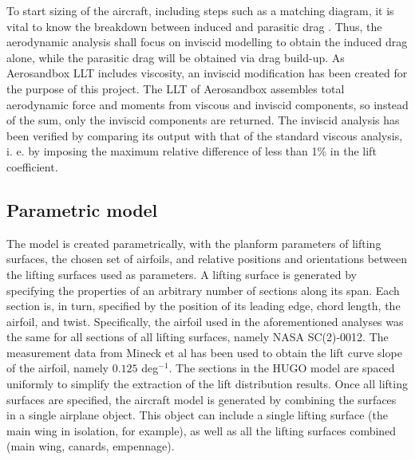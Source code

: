 To start sizing of the aircraft, including steps such as a matching diagram, it is vital to know the breakdown between induced and parasitic drag \cite{Vos}. Thus, the aerodynamic analysis shall focus on inviscid modelling to obtain the induced drag alone, while the parasitic drag will be obtained via drag build-up. As Aerosandbox LLT includes viscosity, an inviscid modification has been created for the purpose of this project. The LLT of Aerosandbox assembles total aerodynamic force and moments from viscous and inviscid components, so instead of the sum, only the inviscid components are returned. The inviscid analysis has been verified by comparing its output with that of the standard viscous analysis, i. e. by imposing the maximum relative difference of less than 1\% in the lift coefficient.

\subsection{Parametric model}
\label{subsec:parametric_model}
The model is created parametrically, with the planform parameters of lifting surfaces, the chosen set of airfoils, and relative positions and orientations between the lifting surfaces used as parameters. A lifting surface is generated by specifying the properties of an arbitrary number of sections along its span. Each section is, in turn, specified by the position of its leading edge, chord length, the airfoil, and twist. Specifically, the airfoil used in the aforementioned analyses was the same for all sections of all lifting surfaces, namely NASA SC(2)-0012. The measurement data from Mineck et al\cite{Mineck1987} has been used to obtain the lift curve slope of the airfoil, namely $0.125$ deg$^{-1}$. The sections in the HUGO model are spaced uniformly to simplify the extraction of the lift distribution results. Once all lifting surfaces are specified, the aircraft model is generated by combining the surfaces in a single airplane object. This object can include a single lifting surface (the main wing in isolation, for example), as well as all the lifting surfaces combined (main wing, canards, empennage).


